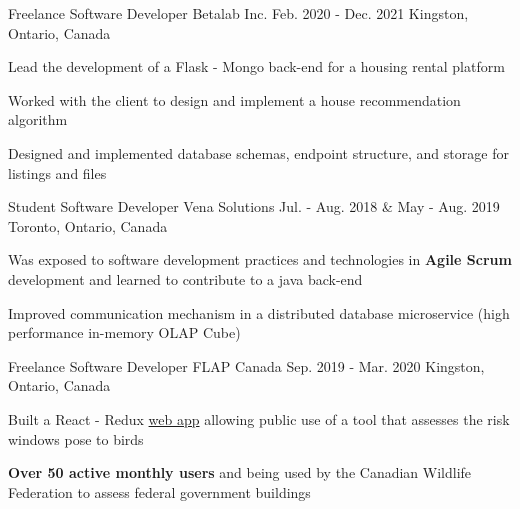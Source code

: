 \begin{cventries}
  \cventry
    {Freelance Software Developer} %
    {Betalab Inc.} %
    {Feb. 2020 - Dec. 2021} %
    {Kingston, Ontario, Canada} %
    {
      \begin{cvitems} %
        \item {Lead the development of a Flask - Mongo back-end for a housing rental platform} %
        \item{Worked with the client to design and implement a house recommendation algorithm}
        \item{Designed and implemented database schemas, endpoint structure, and storage for listings and files}
      \end{cvitems}
    }

  \cventry
    {Student Software Developer} %
    {Vena Solutions} %
    {Jul. - Aug. 2018 \& May - Aug. 2019} %
    {Toronto, Ontario, Canada} %
    {
      \begin{cvitems} %
        \item{Was exposed to software development practices and technologies in \textbf{Agile Scrum} development and learned to contribute to a java back-end}
        \item{Improved communication mechanism in a distributed database microservice (high performance in-memory OLAP Cube)}
      \end{cvitems}
    }

  \cventry
    {Freelance Software Developer} %
    {FLAP Canada} %
    {Sep. 2019 - Mar. 2020} %
    {Kingston, Ontario, Canada} %
    {
      \begin{cvitems} %
        \item {Built a React - Redux \href{https://www.flapapp.ca/}{web app} allowing public use of a tool that assesses the risk windows pose to birds}
        \item{\textbf{Over 50 active monthly users} and being used by the Canadian Wildlife Federation to assess federal government buildings}
      \end{cvitems}
    }


\end{cventries}
